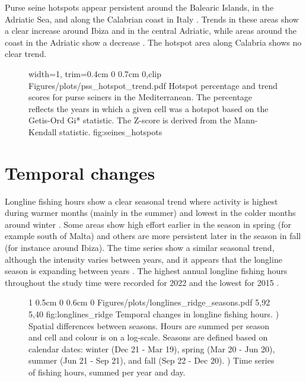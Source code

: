 Purse seine hotspots appear persistent around the Balearic Islands, in the Adriatic Sea, and along
the Calabrian coast in Italy . Trends in these areas show a clear
increase around Ibiza and in the central Adriatic, while areas around the coast in the Adriatic
show a decrease . The hotspot area along Calabria shows no clear
trend.

\begin{figure}[ht]
	{width=1\linewidth, trim=0.4cm 0 0.7cm 0,clip}
	{Figures/plots/pss_hotspot_trend.pdf}
	{%
		Hotspot percentage and trend scores for purse seiners in the Mediterranean.
		The percentage reflects the years in which a given cell was a hotspot based on the Getis-Ord Gi* statistic.
		The Z-score is derived from the Mann-Kendall statistic.}
	{fig:seines_hotspots}
\end{figure}

\FloatBarrier
\section{Temporal changes}
Longline fishing hours show a clear seasonal trend where activity is highest during warmer months
(mainly in the summer) and lowest in the colder months around winter
. Some areas show high effort earlier in the season in spring (for
example south of Malta) and others are more persistent later in the season in fall (for instance
around Ibiza). The time series show a similar seasonal trend, although the intensity varies between
years, and it appears that the longline season is expanding between years
. The highest annual longline fishing hours throughout the study
time were recorded for 2022 and the lowest for 2015 .

\begin{figure}[htp]
	{1\linewidth}                           %
	{0.5cm 0 0.6cm 0}                       %
	{Figures/plots/longlines_ridge_seasons.pdf} %
	{5,92}                                  %
	{5,40}                                  %
	{fig:longlines_ridge}
	{%
		Temporal changes in longline fishing hours. ) Spatial differences between seasons.
		Hours are summed per season and cell and colour is on a log-scale. Seasons are defined based on calendar dates:
		winter (Dec 21 - Mar 19), spring (Mar 20 - Jun 20), summer (Jun 21 - Sep 21), and fall (Sep 22 - Dec 20). )
		Time series of fishing hours, summed per year and day.}
\end{figure}

